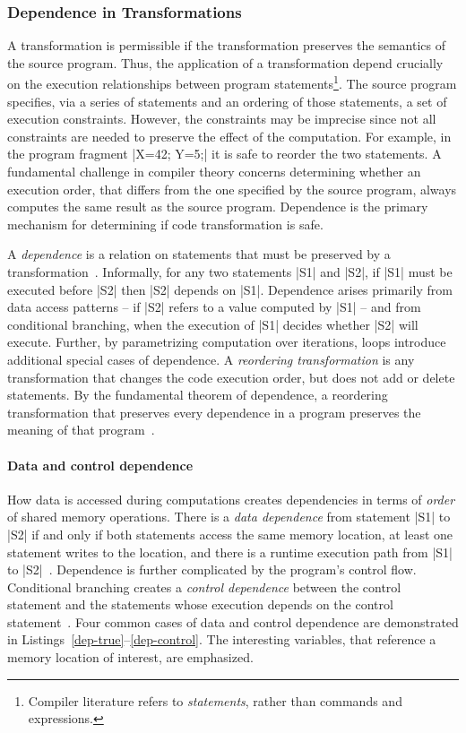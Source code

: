 \subsubsection{Dependence in Transformations}
\label{dependence-analysis}

A transformation is permissible if the transformation preserves the semantics of the source program.
Thus, the application of a transformation depend crucially on the execution {relationships} between program statements\footnote{
Compiler literature refers to \emph{statements}, rather than commands and expressions.}.
The source program specifies,  via a series of statements and an ordering of those statements, a set of {execution constraints}.
However, the constraints may be imprecise since not all constraints are needed to preserve the effect of the computation.
For example, in the program fragment \pr|X=42; Y=5;| it is safe to reorder the two statements.
A fundamental challenge in compiler theory concerns determining whether an execution order, that differs from the one specified by the source program,
always computes the same result as the source program.
Dependence is the primary mechanism for determining if code transformation is safe.

A \emph{dependence} is a relation on statements that must be preserved by a transformation~\cite[p. 47]{kennedy2001}.
Informally, for any two statements \pr|S1| and \pr|S2|, if \pr|S1| must be executed before \pr|S2| then \pr|S2| depends on \pr|S1|.
Dependence arises primarily from data access patterns -- if \pr|S2| refers to a value computed by \pr|S1| -- and from conditional branching, when the execution of \pr|S1| decides whether \pr|S2| will execute.
Further, by parametrizing computation over iterations, loops introduce additional special cases of dependence.
A \emph{reordering transformation} is any transformation that changes the code execution order, but does not add or delete statements.
By the fundamental theorem of dependence, a reordering transformation that preserves every dependence in a program preserves the meaning of that program~\cite[p. 66]{kennedy2001}.

\paragraph*{Data and control dependence}
How data is accessed during computations creates dependencies in terms of \emph{order} of shared memory operations.
There is a \emph{data dependence} from statement \pr|S1| to \pr|S2|
if and only if both statements access the same memory location, at least one statement writes to the location,
and there is a runtime execution path from \pr|S1| to \pr|S2|~\cite[p. 59--60]{kennedy2001}.
Dependence is further complicated by the program's control flow.
Conditional branching creates a \emph{control dependence} between the control statement
and the statements whose execution depends on the control statement~\cite[p. 374]{kennedy2001}.
Four common cases of data and control dependence are demonstrated in Listings~\ref{dep-true}--\ref{dep-control}.
The interesting variables, that reference a memory location of interest, are emphasized.

